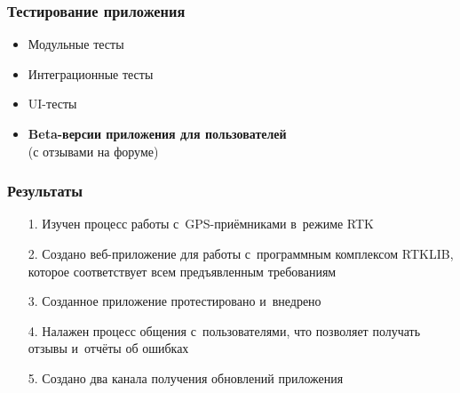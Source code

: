 \documentclass[xetex,с,aspectratio=169]{beamer}
\begin{document}
\begin{frame}
\begin{minipage}[c]{\textwidth}
\begin{minipage}[b]{.64\textwidth}
{\begin{figure}[c]
        \end{figure}
      }
    \end{minipage}
  \end{minipage}
\end{frame}


%
%
\begin{frame}
  \frametitle{Тестирование приложения}
  {
    \Large
    \begin{itemize}
      \setlength\itemsep{0.75em}
      \item Модульные тесты
      \item Интеграционные тесты
      \item UI-тесты\\[1.25em]
      \item \textbf{Beta-версии приложения для пользователей}\\[0.25em](с отзывами на форуме)
    \end{itemize}
  }
\end{frame}


%
%
\begin{frame}
  \frametitle{Результаты}
  {
    \large
    \begin{itemize}
      \setlength\itemsep{1em}
      \item[1.] Изучен процесс работы с~GPS-приёмниками в~режиме RTK
      \item[2.] Создано веб-приложение для работы с~программным комплексом RTKLIB, которое соответствует всем предъявленным требованиям
      \item[3.] Созданное приложение протестировано и~внедрено
      \item[4.] Налажен процесс общения с~пользователями, что позволяет получать отзывы и~отчёты об ошибках
      \item[5.] Создано два канала получения обновлений приложения
    \end{itemize}
  }
\end{frame}


%
%
\begin{frame}[c]
\begin{center}
  \Huge\bfseries
  \color{ifmoblue}{Спасибо за внимание}
\end{center}
\end{frame}
\end{document}
